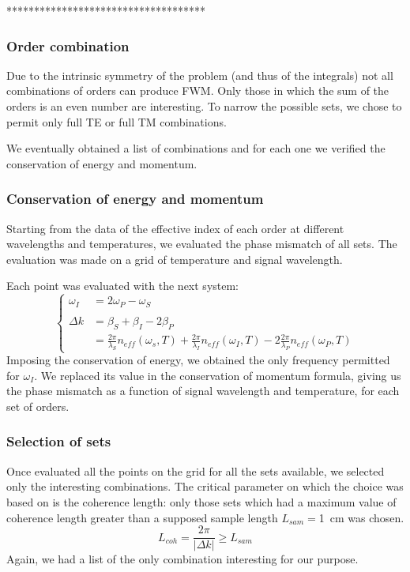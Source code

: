 \documentclass[12pt,a4paper,twoside]{article}
\begin{document}
\vspace{18pt}
************************************

\subsubsection*{Order combination}

Due to the intrinsic symmetry of the problem (and thus of the integrals) not all combinations of orders can produce FWM.
Only those in which the sum of the orders is an even number are interesting.
To narrow the possible sets, we chose to permit only full TE or full TM  combinations.

We eventually obtained a list of combinations and for each one we verified the conservation of energy and momentum.

\subsubsection*{Conservation of energy and momentum}
Starting from the data of the effective index of each order at different wavelengths and temperatures, we evaluated the phase mismatch of all sets.
The evaluation was made on a grid of temperature and signal wavelength.

Each point was evaluated with the next system:
\[
\left\{
	\begin{array}{rl}
		\omega_I		&= 2\omega_P - \omega_S \\
		\\
		\Delta k		&= \beta_S + \beta_I - 2\beta_P \\
					&= \frac{2\pi}{\lambda_S}n_{eff}\left( \omega_s, T \right) + \frac{2\pi}{\lambda_I}n_{eff}\left( \omega_I, T \right) - 2\frac{2\pi}{\lambda_P}n_{eff}\left( \omega_P, T \right)
	\end{array}
\right.
\]
Imposing the conservation of energy, we obtained the only frequency permitted for $\omega_I$.
We replaced its value in the conservation of momentum formula, giving us the phase mismatch as a function of signal wavelength and temperature, for each set of orders.

\subsubsection*{Selection of sets}
Once evaluated all the points on the grid for all the sets available, we selected only the interesting combinations.
The critical parameter on which the choice was based on is the coherence length: only those sets which had a maximum value of coherence length greater than a supposed sample length $L_{sam} = $\SI{1}{\cm} was chosen.
$$L_{coh} = \frac{2\pi}{|\Delta k|} \geq L_{sam}$$
Again, we had a list of the only combination interesting for our purpose.
\end{document}
